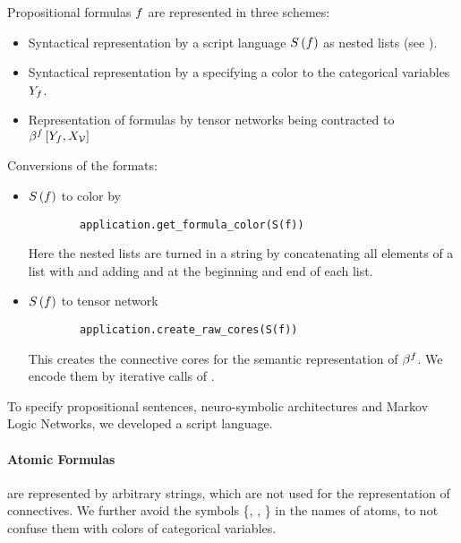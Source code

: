
Propositional formulas $f$ are represented in three schemes:
\begin{itemize}
    \item Syntactical representation by a script language $S\left(f\right)$ as nested lists (see ).
    \item Syntactical representation by a  specifying a color to the categorical variables $Y_{f}$.
    \item Representation of formulas by tensor networks being contracted to $\beta^{f}\left[Y_{f},X_{\mathcal{V}}\right]$
\end{itemize}

Conversions of the formats:
\begin{itemize}
    \item $S\left(f\right)$ to color by
    \begin{lstlisting}
        application.get_formula_color(S(f))
    \end{lstlisting}
    Here the nested lists are turned in a string by concatenating all elements of a list with \stringof{\_} and adding \stringof{[} and \stringof{]} at the beginning and end of each list.
    \item  $S\left(f\right)$ to tensor network
    \begin{lstlisting}
        application.create_raw_cores(S(f))
    \end{lstlisting}
    This creates the connective cores for the semantic representation of $\beta^{f}$.
    We encode them by iterative calls of .
\end{itemize}


\label{subsec:scriptLanguage}

To specify propositional sentences, neuro-symbolic architectures and Markov Logic Networks, we developed a script language.


\paragraph{Atomic Formulas} are represented by arbitrary strings, which are not used for the representation of connectives.
We further avoid the symbols \{\stringof{(}, \stringof{)}, \stringof{\_}\} in the names of atoms, to not confuse them with colors of categorical variables.

